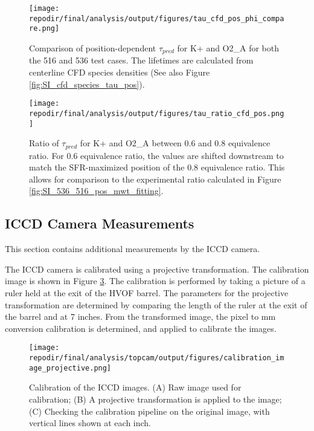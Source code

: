 
\begin{figure}[]
\centering
\texttt{[image: \\repodir/final/analysis/output/figures/tau\_cfd\_pos\_phi\_compare.png]}
\caption{Comparison of position-dependent $\tau_{pred}$ for K+ and O2\_A for both the 516 and 536 test cases. The lifetimes are calculated from centerline CFD species densities (See also Figure \ref{fig:SI_cfd_species_tau_pos}).}
\label{fig:SI_tau_cfd_pos_phi_compare}
\end{figure}



\begin{figure}[]
\centering
\texttt{[image: \\repodir/final/analysis/output/figures/tau\_ratio\_cfd\_pos.png]}
\caption{Ratio of $\tau_{pred}$ for K+ and O2\_A between 0.6 and 0.8 equivalence ratio. For 0.6 equivalence ratio, the values are shifted downstream to match the SFR-maximized position of the 0.8 equivalence ratio. This allows for comparison to the experimental ratio calculated in Figure \ref{fig:SI_536_516_pos_mwt_fitting}.}
\label{fig:SI_tau_ratio_cfd_pos}
\end{figure}

\clearpage
\subsection{ICCD Camera Measurements}

This section contains additional measurements by the ICCD camera. 

The ICCD camera is calibrated using a projective transformation. The calibration image is shown in Figure \ref{fig:SI_iccd_calibration}. The calibration is performed by taking a picture of a ruler held at the exit of the HVOF barrel. The parameters for the projective transformation are determined by comparing the length of the ruler at the exit of the barrel and at 7 inches. From the transformed image, the pixel to mm conversion calibration is determined, and applied to calibrate the images. 

\begin{figure}[]
\centering
\texttt{[image: \\repodir/final/analysis/topcam/output/figures/calibration\_image\_projective.png]}
\caption{Calibration of the ICCD images. (A) Raw image used for calibration; (B) A projective transformation is applied to the image; (C) Checking the calibration pipeline on the original image, with vertical lines shown at each inch.}
\label{fig:SI_iccd_calibration}
\end{figure}

